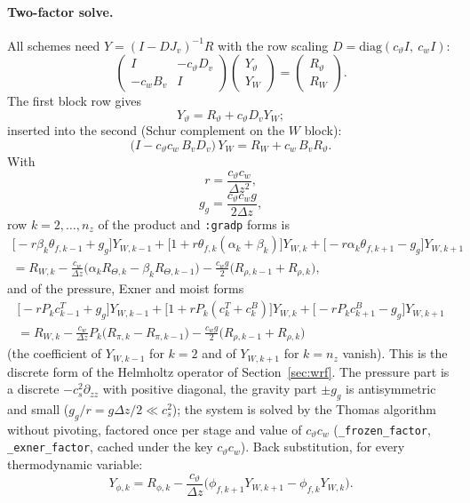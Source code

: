 \documentclass[11pt,a4paper]{article}
\newcommand{\code}[1]{\texttt{\small #1}}
\newcommand{\tv}{\vartheta}   %
\begin{document}
\paragraph{Two-factor solve.} All schemes need $Y=(I-DJ_v)^{-1}R$ with the row scaling $D=\mathrm{diag}(c_\tv I,\ c_wI)$:
\[
\begin{pmatrix}I&-c_\tv D_v\\-c_wB_v&I\end{pmatrix}\begin{pmatrix}Y_\tv\\Y_W\end{pmatrix}=\begin{pmatrix}R_\tv\\R_W\end{pmatrix}.
\]
The first block row gives
\[
Y_\tv=R_\tv+c_\tv D_vY_W ;
\]
inserted into the second (Schur complement on the $W$ block):
\[
\big(I-c_\tv c_w\,B_vD_v\big)\,Y_W=R_W+c_w\,B_vR_\tv .
\]
With
\[
r=\frac{c_\tv c_w}{\Delta z^2},
\]
\[
g_g=\frac{c_\tv c_wg}{2\Delta z},
\]
row $k=2,\dots,n_z$ of the product and \code{:gradp} forms is
\begin{multline*}
\big[-r\beta_k\theta_{f,k-1}+g_g\big]Y_{W,k-1}+\big[1+r\theta_{f,k}(\alpha_k+\beta_k)\big]Y_{W,k}+\big[-r\alpha_k\theta_{f,k+1}-g_g\big]Y_{W,k+1}\\
=R_{W,k}-\frac{c_w}{\Delta z}\big(\alpha_kR_{\Theta,k}-\beta_kR_{\Theta,k-1}\big)-\frac{c_wg}2\big(R_{\rho,k-1}+R_{\rho,k}\big),
\end{multline*}
and of the pressure, Exner and moist forms
\begin{multline*}
\big[-rP_kc^T_{k-1}+g_g\big]Y_{W,k-1}+\big[1+rP_k(c^T_k+c^B_k)\big]Y_{W,k}+\big[-rP_kc^B_{k+1}-g_g\big]Y_{W,k+1}\\
=R_{W,k}-\frac{c_w}{\Delta z}P_k\big(R_{\pi,k}-R_{\pi,k-1}\big)-\frac{c_wg}2\big(R_{\rho,k-1}+R_{\rho,k}\big)
\end{multline*}
(the coefficient of $Y_{W,k-1}$ for $k=2$ and of $Y_{W,k+1}$ for $k=n_z$ vanish). This is the discrete form of the
Helmholtz operator of Section~\ref{sec:wrf}. The pressure part is a discrete $-c_s^2\partial_{zz}$ with positive
diagonal, the gravity part $\pm g_g$ is antisymmetric and small ($g_g/r=g\Delta z/2\ll c_s^2$); the system is solved by the
Thomas algorithm without pivoting, factored once per stage and value of $c_\tv c_w$ (\code{\_frozen\_factor},
\code{\_exner\_factor}, cached under the key $c_\tv c_w$). Back substitution, for every thermodynamic variable:
\[
Y_{\phi,k}=R_{\phi,k}-\frac{c_\tv}{\Delta z}\big(\phi_{f,k+1}Y_{W,k+1}-\phi_{f,k}Y_{W,k}\big) .
\]
\end{document}
